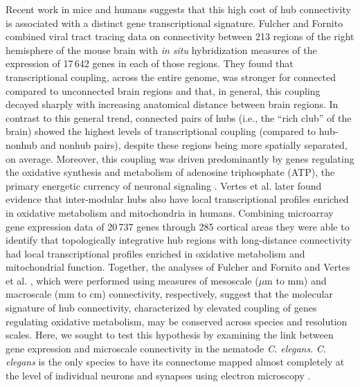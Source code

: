 \documentclass[10pt,letterpaper]{article}
\begin{document}
Recent work in mice and humans suggests that this high cost of hub connectivity is associated with a distinct gene transcriptional signature.
Fulcher and Fornito \cite{Fulcher:2016ck} combined viral tract tracing data on connectivity between 213 regions of the right hemisphere of the mouse brain \cite{Oh2014} with \emph{in situ} hybridization measures of the expression of 17\,642 genes in each of those regions.
They found that transcriptional coupling, across the entire genome, was stronger for connected compared to unconnected brain regions and that, in general, this coupling decayed sharply with increasing anatomical distance between brain regions.
In contrast to this general trend, connected pairs of hubs (i.e., the ``rich club'' of the brain) showed the highest levels of transcriptional coupling (compared to hub-nonhub and nonhub pairs), despite these regions being more spatially separated, on average.
Moreover, this coupling was driven predominantly by genes regulating the oxidative synthesis and metabolism of adenosine triphosphate (ATP), the primary energetic currency of neuronal signaling \cite{Lennie:2003ia, Laughlin:2003vu}.
Vertes et al. \cite{Vertes2016a} later found evidence that inter-modular hubs also have local transcriptional profiles enriched in oxidative metabolism and mitochondria in humans.
Combining microarray gene expression data of 20\,737 genes through 285 cortical areas they were able to identify that topologically integrative hub regions with long-distance connectivity had local transcriptional profiles enriched in oxidative metabolism and mitochondrial function.
Together, the analyses of Fulcher and Fornito \cite{Fulcher:2016ck} and Vertes et al. \cite{Vertes2016a}, which were performed using measures of mesoscale ($\mu$m to mm) and macroscale (mm to cm) connectivity, respectively, suggest that the molecular signature of hub connectivity, characterized by elevated coupling of genes regulating oxidative metabolism, may be conserved across species and resolution scales.
Here, we sought to test this hypothesis by examining the link between gene expression and microscale connectivity in the nematode \emph{C. elegans}.
\emph{C. elegans} is the only species to have its connectome mapped almost completely at the level of individual neurons and synapses using electron microscopy \cite{White:1986tx, Varshney2011}.
\end{document}
